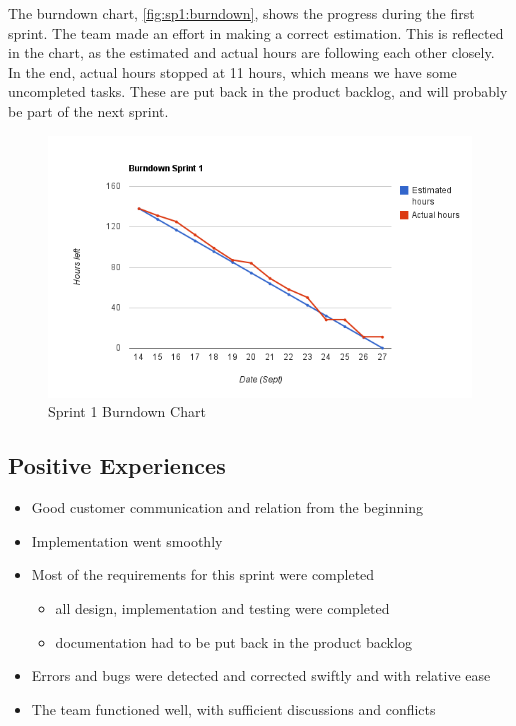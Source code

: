 The burndown chart, \autoref{fig:sp1:burndown}, shows the progress during
the first sprint. The team made an effort in making a correct estimation. This
is reflected in the chart, as the estimated and actual hours are  following
each other closely. In the end, actual hours stopped at 11 hours, which means we
have some uncompleted tasks. These are put back in the product backlog, and will
probably be part of the next sprint. 

\begin{figure}[!htb]
	\includegraphics[width=\textwidth]{./sprints/img/burndown_chart_s1}
	\caption{Sprint 1 Burndown Chart\label{fig:sp1:burndown}}
\end{figure}

\subsection{Positive Experiences}
\begin{itemize}
	\item Good customer communication and relation from the beginning
	\item Implementation went smoothly
	\item Most of the requirements for this sprint were completed
	\begin{itemize} 
		\item all design, implementation and testing were completed
		\item documentation had to be put back in the product backlog 
	\end{itemize}
	\item Errors and bugs were detected and corrected swiftly and with relative ease
	\item The team functioned well, with sufficient discussions and conflicts
\end{itemize}

